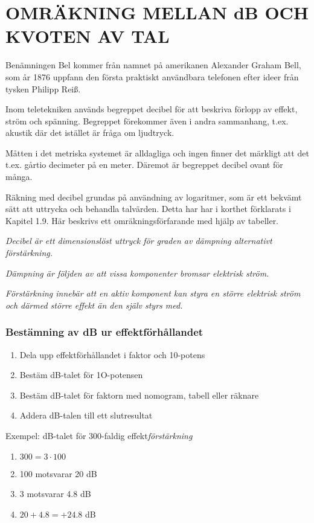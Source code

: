 \chapter{OMRÄKNING MELLAN dB OCH KVOTEN AV TAL}
\label{decibel}

Benämningen Bel kommer från namnet på amerikanen Alexander Graham
Bell, som år 1876 uppfann den första praktiskt användbara telefonen
efter ideer från tysken Philipp Reiß.

Inom teletekniken används begreppet decibel för att beskriva förlopp
av effekt, ström och spänning.  Begreppet förekommer även i andra
sammanhang, t.ex. akustik där det istället är fråga om ljudtryck.

Måtten i det metriska systemet är alldagliga och ingen finner det
märkligt att det t.ex. gårtio decimeter på en meter. Däremot är
begreppet decibel ovant för många.

Räkning med decibel grundas på användning av logaritmer, som är ett
bekvämt sätt att uttrycka och behandla talvärden.  Detta har har i
korthet förklarats i Kapitel 1.9.  Här beskrivs ett
omräkningsförfarande med hjälp av tabeller.

\emph{Decibel är ett dimensionslöst uttryck för graden av dämpning
  alternativt förstärkning.}

\emph{Dämpning är följden av att vissa komponenter bromsar elektrisk
  ström.}

\emph{Förstärkning innebär att en aktiv komponent kan styra en större
  elektrisk ström och därmed större effekt än den själv styrs med.}

\subsection{Bestämning av dB ur effektförhållandet}

\begin{enumerate}
\item Dela upp effektförhållandet i faktor och 10-potens
\item Bestäm dB-talet för 1O-potensen
\item Bestäm dB-talet för faktorn med nomogram, tabell eller räknare
\item Addera dB-talen till ett slutresultat
\end{enumerate}

Exempel: dB-talet för 300-faldig effekt\emph{förstärkning}
\begin{enumerate}
\item \(300 = 3 \cdot 100\)
\item 100 motsvarar 20 dB
\item 3 motsvarar 4.8 dB
\item \(20 + 4.8 = +24.8\) dB
\end{enumerate}

